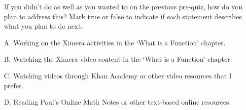 \documentclass{ximera}
\begin{document}
\begin{problem}

If you didn't do as well as you wanted to on the previous pre-quiz, how do you plan to address this?  Mark true or false to indicate if each statement describes what you plan to do next.

\vspace{1 in}

\begin{problem}

    A. Working on the Ximera activities in the `What is a Function' chapter.

    \begin{multipleChoice}
    \end{multipleChoice}
    
\end{problem}

\begin{problem}
    
    B. Watching the Ximera video content in the `What is a Function' chapter. 
    
    \begin{multipleChoice}
    \end{multipleChoice}
    
\end{problem}
\begin{problem}
    
    C. Watching videos through Khan Academy or other video resources that I prefer.

    \begin{multipleChoice}
    \end{multipleChoice}
    
\end{problem}
\begin{problem}
    
    D. Reading Paul's Online Math Notes or other text-based online resources.

    \begin{multipleChoice}
    \end{multipleChoice}
    
\end{problem}
\begin{problem}
    

\end{problem}
\end{problem}
\end{document}
